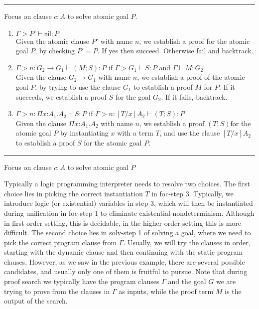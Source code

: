 \documentclass{acmconf}
\newcommand{\figfoot}{\vspace{1ex}\hrule}
\newcommand{\fighead}{\hrule\vspace{1.5ex}}
\newcommand{\nil}{\mathsf{nil}}
\newcommand{\vd}{\vdash}
\newcommand{\arrow}{\rightarrow}
\newcommand{\oftp}{\mathord{:}}
\begin{document}
\begin{table}[h]
\fighead
\begin{small}
Focus on clause $ c : A$ to solve atomic goal $P$.
\begin{enumerate}
\item $\Gamma > P' \vd \nil : P$ \\
 Given the atomic clause $P'$ with name $n$, we establish a proof for the
  atomic goal $P$, by checking  $P' = P$. If yes then
  succeed. Otherwise fail and backtrack.  
\item $\Gamma > n : G_2 \arrow G_1 \vd (M ; S) : P$ 
      if $\Gamma > G_1 \vd S : P$ and  $\Gamma \vd M : G_2$ \\
  Given the clause $G_2 \arrow G_1$ with name $n$, we establish a
  proof of the atomic goal $P$, by trying to use the clause $G_1$ to
  establish a proof $M$ for $P$. If it succeeds, we establish a proof
  $S$ for the goal $G_2$. If it fails,  backtrack. 
\item $\Gamma > n : \Pi x\oftp A_1. A_2 \vd S : P$ if $\Gamma > n :
  [T/x]A_2 \vd (T ; S) : P$\\
  Given the clause $\Pi x\oftp A_1. A_2$ with name $n$, we
  establish a proof $(T ; S)$for the atomic goal $P$ by instantiating
  $x$ with a term $T$, and use the clause $[T/x]A_2$
  to establish a proof $S$ for the atomic goal $P$. 
\end{enumerate}
\end{small}
\figfoot
  \caption{Focus on clause $c:A$ to solve atomic goal $P$}
  \label{tab:foc}
\end{table}


Typically a logic programming interpreter needs to resolve two
choices. The first choice lies in picking the correct instantiation
$T$ in foc-step 3. Typically, we introduce logic (or existential) variables in step
3, which will then be instantiated during unification in foc-step 1 to
eliminate existential-nondeterminism. Although in first-order setting,
this is decidable, in the higher-order setting this is more
difficult. The second choice lies in solv-step 1 of solving a goal,
where we need to pick the correct program clause from
$\Gamma$. Usually, we will try the clauses in order, starting with the
dynamic clause and then continuing with the static program
clauses. However, as we saw in the previous example, there are several
possible candidates, and usually only one of them is fruitful to
pursue. Note that during proof search we typically have the program
clauses $\Gamma$ and the goal $G$ we are trying to prove from the
clauses in $\Gamma$ as inputs, while the proof term $M$ is the output
of the search.
\end{document}
